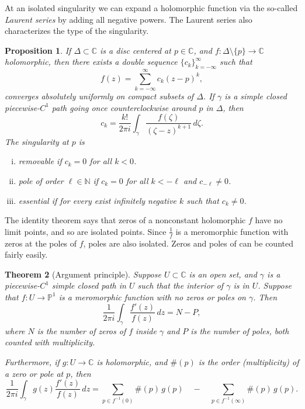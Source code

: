 \documentclass[12pt,openany]{book}
\newcommand{\C}{{\mathbb{C}}}
\newcommand{\N}{{\mathbb{N}}}
\newcommand{\bP}{{\mathbb{P}}}
\newcommand{\myindex}[1]{#1\index{#1}}
\theoremstyle{plain}
\newtheorem{thm}{Theorem}[section]
\newtheorem{prop}[thm]{Proposition}
\theoremstyle{remark}
\theoremstyle{definition}
\theoremstyle{exercise}
\theoremstyle{example}
\begin{document}
At an isolated singularity we can expand a holomorphic function
via the so-called
\emph{\myindex{Laurent series}} by adding all negative powers.
The Laurent series also characterizes the type of the singularity.

\begin{prop}
If $\Delta \subset \C$ is a disc centered at $p \in \C$,
and $f \colon \Delta \setminus \{p\} \to \C$ holomorphic,
then there exists a double sequence $\{ c_{k} \}_{k = -\infty}^\infty$
such that
\begin{equation*}
f(z) = \sum_{k=-\infty}^\infty c_k {(z-p)}^k ,
\end{equation*}
converges absolutely uniformly on compact subsets of $\Delta$.  If $\gamma$
is a simple closed piecewise-$C^1$ path going once counterclockwise around
$p$ in $\Delta$, then
\begin{equation*}
c_k = 
\frac{k!}{2\pi i}
\int_{\gamma}
\frac{f(\zeta)}{{(\zeta-z)}^{k+1}}
\,
d \zeta  .
\end{equation*}
The singularity at $p$ is
\begin{enumerate}[(i)]
\item \emph{removable} if $c_k = 0$ for all $k < 0$.
\item \emph{pole} of order $\ell \in \N$ if $c_k = 0$ for all $k < -\ell$ and $c_{-\ell}
\not= 0$.
\item \emph{essential} if for every exist infinitely negative $k$
such that $c_k \not= 0$.
\pagebreak[3]
\end{enumerate}
\end{prop}

The identity theorem says that zeros of a nonconstant holomorphic $f$
have no limit points, and so are isolated points.
Since $\frac{1}{f}$ is a meromorphic
function with zeros at the poles of $f$, poles are also
isolated.  Zeros and poles of  can be counted fairly easily.

\begin{thm}[Argument principle]\label{thm:onevarargprinc}
Suppose $U \subset \C$ is an open set, and $\gamma$ is a piecewise-$C^1$
simple closed path in $U$ such that the interior of $\gamma$ is in $U$.
Suppose that $f \colon U \to \bP^1$ is a meromorphic function with no zeros
or poles on $\gamma$.
Then
\begin{equation*}
\frac{1}{2\pi i}
\int_\gamma \frac{f'(z)}{f(z)} \, dz
= N - P ,
\end{equation*}
where $N$ is the number of zeros of $f$ inside $\gamma$ and $P$ is the
number of poles, both counted with multiplicity.

Furthermore, if $g \colon U \to \C$ is holomorphic, and $\#(p)$ is the order
(multiplicity) of a zero or pole at $p$, then
\begin{equation*}
\frac{1}{2\pi i}
\int_\gamma g(z) \frac{f'(z)}{f(z)} \, dz
=
\sum_{p \in f^{-1}(0)}
\#(p) \, g(p)
\quad
-
\quad
\sum_{p \in f^{-1}(\infty)}
\#(p) \, g(p) .
\end{equation*}
\end{thm}
\end{document}
